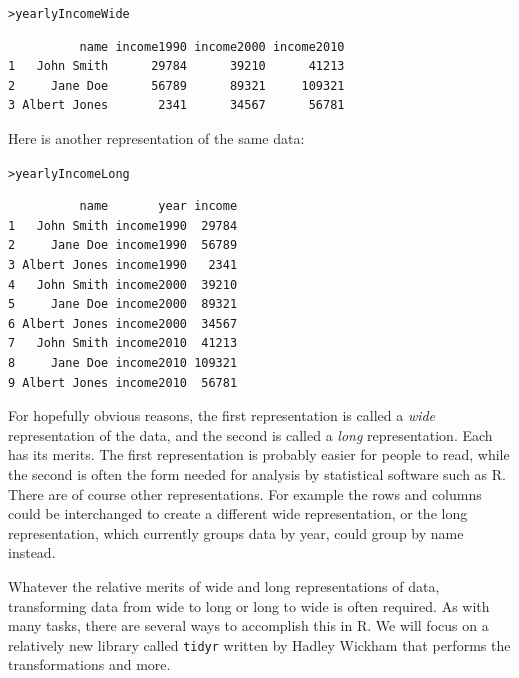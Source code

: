 \documentclass[12pt,oneside]{book}\usepackage[]{graphicx}\usepackage[]{color}
\makeatletter
\newcommand{\hlstd}[1]{\textcolor[rgb]{0.345,0.345,0.345}{#1}}%
\newenvironment{kframe}{%
 \def\at@end@of@kframe{}%
 \ifinner\ifhmode%
  \def\at@end@of@kframe{\end{minipage}}%
  \begin{minipage}{\columnwidth}%
 \fi\fi%
 \def\FrameCommand##1{\hskip\@totalleftmargin \hskip-\fboxsep
 \colorbox{shadecolor}{##1}\hskip-\fboxsep
     \hskip-\linewidth \hskip-\@totalleftmargin \hskip\columnwidth}%
 \MakeFramed {\advance\hsize-\width
   \@totalleftmargin\z@ \linewidth\hsize
   \@setminipage}}%
 {\par\unskip\endMakeFramed%
 \at@end@of@kframe}
\newenvironment{knitrout}{}{} %
\makeatother
\begin{document}
\begin{knitrout}
\color{fgcolor}\begin{kframe}
\begin{alltt}
\hlstd{> }\hlstd{yearlyIncomeWide}
\end{alltt}
\begin{verbatim}
          name income1990 income2000 income2010
1   John Smith      29784      39210      41213
2     Jane Doe      56789      89321     109321
3 Albert Jones       2341      34567      56781
\end{verbatim}
\end{kframe}
\end{knitrout}
Here is another representation of the same data:
\begin{knitrout}
\color{fgcolor}\begin{kframe}
\begin{alltt}
\hlstd{> }\hlstd{yearlyIncomeLong}
\end{alltt}
\begin{verbatim}
          name       year income
1   John Smith income1990  29784
2     Jane Doe income1990  56789
3 Albert Jones income1990   2341
4   John Smith income2000  39210
5     Jane Doe income2000  89321
6 Albert Jones income2000  34567
7   John Smith income2010  41213
8     Jane Doe income2010 109321
9 Albert Jones income2010  56781
\end{verbatim}
\end{kframe}
\end{knitrout}
For hopefully obvious reasons, the first representation is called a \emph{wide} representation of the data, and the second is called a \emph{long} representation. Each has its merits. The first representation is probably easier for people to read, while the second is often the form needed for analysis by statistical software such as R. There are of course other representations. For example the rows and columns could be interchanged to create a different wide representation, or the long representation, which currently groups data by year, could group by name instead. 

Whatever the relative merits of wide and long representations of data, transforming data from wide to long or long to wide is often required. As with many tasks, there are several ways to accomplish this in R. We will focus on a relatively new library called \verb+tidyr+ written by Hadley Wickham that performs the transformations and more.
\end{document}
